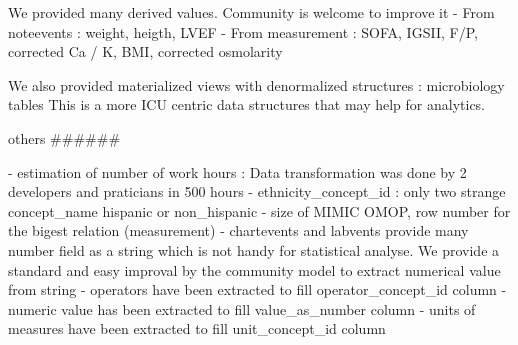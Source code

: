 We provided many derived values. Community is welcome to improve it
- From noteevents : weight, heigth, LVEF
- From measurement : SOFA, IGSII, F/P, corrected Ca / K, BMI, corrected osmolarity

We also provided materialized views with denormalized structures : microbiology tables
This is a more ICU centric data structures that may help for analytics.

others
######

- estimation of number of work hours : Data transformation was done by 2 developers and praticians in 500 hours
- ethnicity_concept_id : only two strange concept_name hispanic or non_hispanic
- size of MIMIC OMOP, row number for the bigest relation (measurement)
- chartevents and labvents provide many number field as a string which is not handy for statistical analyse. We provide a standard and easy improval by the community model to extract numerical value from string
	- operators have been extracted to fill operator_concept_id column
	- numeric value has been extracted to fill value_as_number column
	- units of measures have been extracted to fill unit_concept_id column
